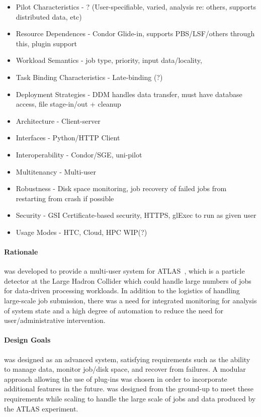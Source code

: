 \documentclass{sig-alternate}
\begin{document}
\begin{itemize}
  \item
    Pilot Characteristics - ? (User-specifiable, varied, analysis re: others,
    supports distributed data, etc)
  \item
    Resource Dependences - Condor Glide-in, supports PBS/LSF/others through this, plugin support
  \item
    Workload Semantics - job type, priority, input data/locality,
  \item
    Task Binding Characteristics - Late-binding (?)
  \item
    Deployment Strategies - DDM handles data transfer, must have database access,
    file stage-in/out + cleanup
  \item
    Architecture - Client-server
  \item
    Interfaces - Python/HTTP Client
  \item
    Interoperability - Condor/SGE, uni-pilot
  \item
    Multitenancy - Multi-user
  \item
    Robustness - Disk space monitoring, job recovery of failed jobs from restarting
    from crash if possible
  \item
    Security - GSI Certificate-based security, HTTPS, glExec to run as given user
  \item
    Usage Modes - HTC, Cloud, HPC WIP(?)
\end{itemize}

\paragraph{Rationale}
\panda was developed to provide a multi-user
\pilotjob system for ATLAS~\cite{aad2008atlas}, which is
a particle detector at the Large Hadron Collider
which could
handle large numbers
of jobs for data-driven processing workloads.
In addition to the logistics of handling large-scale job submission, there was
a need for integrated monitoring for analysis of system state and a high
degree of automation to reduce the need for user/administrative intervention.

\paragraph{Design Goals}
\panda was designed as an advanced \pilotjob system,
satisfying requirements such as the ability
to manage data, monitor job/disk space, and recover from failures.
A modular approach allowing the use of plug-ins was chosen in order
to incorporate additional features in the future.
\panda was designed from the ground-up to meet these requirements
while scaling to handle the large scale of jobs and data produced
by the ATLAS experiment.
\end{document}
